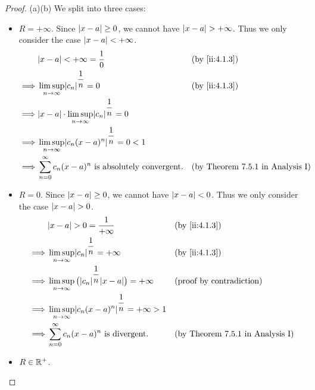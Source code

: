 \begin{proof}{(a)}{(b)}
  We split into three cases:
  \begin{itemize}
    \item \(R = +\infty\).
          Since \(\left\lvert x - a\right\rvert \geq 0\), we cannot have \(\left\lvert x - a\right\rvert > +\infty\).
          Thus we only consider the case \(\left\lvert x - a\right\rvert < +\infty\).
          \begin{align*}
                     & \abs{x - a} < +\infty = \dfrac{1}{0}                                  &  & \by{ii:4.1.3}                           \\
            \implies & \limsup_{n \to \infty} \abs{c_n}^{\dfrac{1}{n}} = 0                   &  & \by{ii:4.1.3}                           \\
            \implies & \abs{x - a} \cdot \limsup_{n \to \infty} \abs{c_n}^{\dfrac{1}{n}} = 0                                              \\
            \implies & \limsup_{n \to \infty} \abs{c_n (x - a)^n}^{\dfrac{1}{n}} = 0 < 1                                                  \\
            \implies & \sum_{n = 0}^\infty c_n (x - a)^n \text{ is absolutely convergent}.   &  & \text{(by Theorem 7.5.1 in Analysis I)}
          \end{align*}
    \item \(R = 0\).
          Since \(\left\lvert x - a\right\rvert \geq 0\), we cannot have \(\left\lvert x - a\right\rvert < 0\).
          Thus we only consider the case \(\left\lvert x - a\right\rvert > 0\).
          \begin{align*}
                     & \abs{x - a} > 0 = \dfrac{1}{+\infty}                                            &  & \by{ii:4.1.3}                           \\
            \implies & \limsup_{n \to \infty} \abs{c_n}^{\dfrac{1}{n}} = +\infty                       &  & \by{ii:4.1.3}                           \\
            \implies & \limsup_{n \to \infty} \big(\abs{c_n}^{\dfrac{1}{n}} \abs{x - a}\big) = +\infty &  & \text{(proof by contradiction)}         \\
            \implies & \limsup_{n \to \infty} \abs{c_n (x - a)^n}^{\dfrac{1}{n}} = +\infty > 1                                                      \\
            \implies & \sum_{n = 0}^\infty c_n (x - a)^n \text{ is divergent}.                         &  & \text{(by Theorem 7.5.1 in Analysis I)}
          \end{align*}
    \item \(R \in \mathbb{R}^+\).

\end{itemize}
\end{proof}
